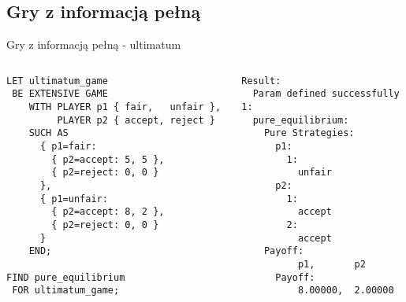 \documentclass[xcolor=x11names,compress]{beamer}
\renewcommand{\(}{\begin{columns}}
\renewcommand{\)}{\end{columns}}
\newcommand{\<}[1]{\begin{column}{#1}}
\renewcommand{\>}{\end{column}}
\begin{document}
\subsection{Gry z informacją pełną}
\begin{frame}[fragile]{Gry z informacją pełną - ultimatum}
\begin{columns}[c]
\begin{column}{.5\textwidth}
\begin{lstlisting}
LET ultimatum_game
 BE EXTENSIVE GAME
    WITH PLAYER p1 { fair,   unfair },
         PLAYER p2 { accept, reject }
    SUCH AS
      { p1=fair:
        { p2=accept: 5, 5 },
        { p2=reject: 0, 0 }
      },
      { p1=unfair:
        { p2=accept: 8, 2 },
        { p2=reject: 0, 0 }
      }
    END;

FIND pure_equilibrium
 FOR ultimatum_game;
\end{lstlisting}
\end{column}
\vrule
\begin{column}{.5\textwidth}
\begin{lstlisting}
Result:
  Param defined successfully
1:
  pure_equilibrium:
    Pure Strategies:
      p1:
        1:
          unfair
      p2:
        1:
          accept
        2:
          accept
    Payoff:
          p1,       p2
      Payoff:
          8.00000,  2.00000
\end{lstlisting}
\end{column}
\end{columns}
\end{frame}
\end{document}
